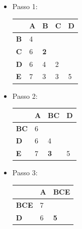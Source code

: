 \documentclass[
    article,            %
    11pt,               %
    oneside,            %
    a4paper,            %
    english,            %
    brazil,             %
    sumario=tradicional,
    ]{abntex2}
\begin{document}
\begin{itemize}
    \item{Passo 1:}
        \begin{table}[H]
        \centering
        \label{my-label}
        \begin{tabular}{|l|l|l|l|l|}
        \hline
                   & \textbf{A} & \textbf{B}                        & \textbf{C} & \textbf{D} \\ \hline
        \textbf{B} & 4          &                                   &            &            \\ \hline
        \textbf{C} & 6          & {\color[HTML]{FE0000} \textbf{2}} &            &            \\ \hline
        \textbf{D} & 6          & 4                                 & 2          &            \\ \hline
        \textbf{E} & 7          & 3                                 & 3          & 5          \\ \hline
        \end{tabular}
        \end{table}
    
    \item{Passo 2:}
        \begin{table}[H]
        \centering
        \label{my-label}
        \begin{tabular}{|l|l|l|l|}
        \hline
                    & \textbf{A}               & \textbf{BC}                       & \textbf{D} \\ \hline
        \textbf{BC} & {\color[HTML]{333333} 6} &                                   &            \\ \hline
        \textbf{D}  & 6                        & 4                                 &            \\ \hline
        \textbf{E}  & 7                        & {\color[HTML]{FE0000} \textbf{3}} & 5          \\ \hline
        \end{tabular}
        \end{table}

    \item{Passo 3:}
        \begin{table}[h]
        \centering
        \label{my-label}
        \begin{tabular}{|l|l|l|}
        \hline
                     & \textbf{A} & \textbf{BCE}                      \\ \hline
        \textbf{BCE} & 7          &                                   \\ \hline
        \textbf{D}   & 6          & {\color[HTML]{FE0000} \textbf{5}} \\ \hline
        \end{tabular}
        \end{table}


\end{itemize}
\end{document}
